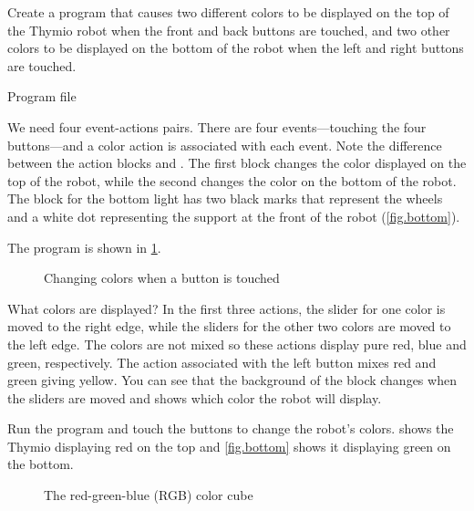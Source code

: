 \label{ch.colors}


Create a program that causes two different colors to be displayed on the
top of the Thymio robot when the front and back buttons are touched, and
two other colors to be displayed on the bottom of the robot when the
left and right buttons are touched.

{\raggedleft \hfill Program file }

We need four event-actions pairs. There are four events---touching the
four buttons---and a color action is associated with each event. Note
the difference between the action blocks  and
. The first block changes the color displayed
on the top of the robot, while the second changes the color on the
bottom of the robot. The block for the bottom light has two black marks
that represent the wheels and a white dot representing the support at
the front of the robot (\cref{fig.bottom}).

The program is shown in \cref{fig.colors}.

\begin{figure}
\caption{Changing colors when a button is touched}\label{fig.colors}
\end{figure}

What colors are displayed? In the first three actions, the slider for
one color is moved to the right edge, while the sliders for the other
two colors are moved to the left edge. The colors are not mixed so these
actions display pure red, blue and green, respectively. The action
associated with the left button mixes red and green giving yellow. You
can see that the background of the block changes when the
sliders are moved and shows which color the robot will display.

Run the program  and touch the buttons to change the
robot's colors.  shows the Thymio displaying red on the
top and \cref{fig.bottom} shows it displaying green on the bottom.



\begin{figure}
\caption{The red-green-blue (RGB) color cube}\label{fig.cube}
\end{figure}


